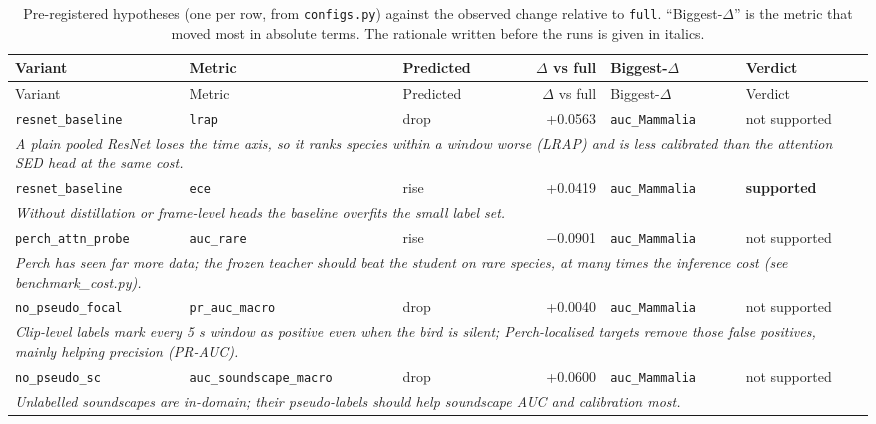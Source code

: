 \begingroup\footnotesize
\begin{longtable}{p{3.1cm}p{3.3cm}p{1.4cm}rp{2.9cm}p{1.8cm}}
\caption{Pre-registered hypotheses (one per row, from \texttt{configs.py}) against the observed change relative to \texttt{full}. ``Biggest-$\Delta$'' is the metric that moved most in absolute terms. The rationale written before the runs is given in italics.}\label{tab:hyp}\\
\toprule Variant & Metric & Predicted & $\Delta$ vs full & Biggest-$\Delta$ & Verdict \\ \midrule
\endfirsthead
\toprule Variant & Metric & Predicted & $\Delta$ vs full & Biggest-$\Delta$ & Verdict \\ \midrule
\endhead
\bottomrule
\endlastfoot
\texttt{resnet\_baseline} & \texttt{lrap} & drop & +0.0563 & \texttt{auc\_Mammalia} & not supported \\
\multicolumn{6}{p{15cm}}{\emph{A plain pooled ResNet loses the time axis, so it ranks species within a window worse (LRAP) and is less calibrated than the attention SED head at the same cost.}} \\[2pt]
\texttt{resnet\_baseline} & \texttt{ece} & rise & +0.0419 & \texttt{auc\_Mammalia} & \textbf{supported} \\
\multicolumn{6}{p{15cm}}{\emph{Without distillation or frame-level heads the baseline overfits the small label set.}} \\[2pt]
\texttt{perch\_attn\_probe} & \texttt{auc\_rare} & rise & $-$0.0901 & \texttt{auc\_Mammalia} & not supported \\
\multicolumn{6}{p{15cm}}{\emph{Perch has seen far more data; the frozen teacher should beat the student on rare species, at many times the inference cost (see benchmark\_cost.py).}} \\[2pt]
\texttt{no\_pseudo\_focal} & \texttt{pr\_auc\_macro} & drop & +0.0040 & \texttt{auc\_Mammalia} & not supported \\
\multicolumn{6}{p{15cm}}{\emph{Clip-level labels mark every 5 s window as positive even when the bird is silent; Perch-localised targets remove those false positives, mainly helping precision (PR-AUC).}} \\[2pt]
\texttt{no\_pseudo\_sc} & \texttt{auc\_soundscape\_macro} & drop & +0.0600 & \texttt{auc\_Mammalia} & not supported \\
\multicolumn{6}{p{15cm}}{\emph{Unlabelled soundscapes are in-domain; their pseudo-labels should help soundscape AUC and calibration most.}} \\[2pt]

\end{longtable}
